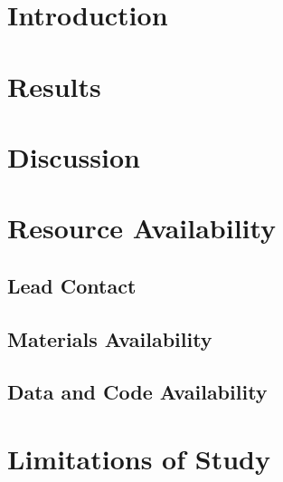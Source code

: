 \documentclass{article}
\title{}
\author{}
\begin{document}
\maketitle


\begin{abstract}
\end{abstract}

\section{Introduction}

\section{Results}

\section{Discussion}

\section{Resource Availability}

\subsection{Lead Contact}


\subsection{Materials Availability}


\subsection{Data and Code Availability}


\section{Limitations of Study}
\end{document}
